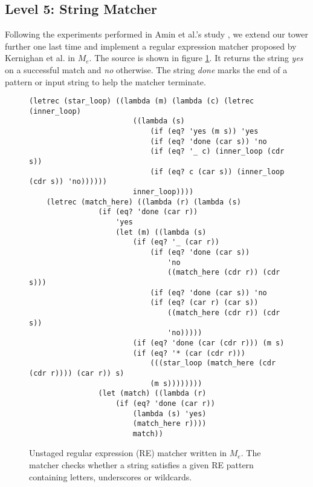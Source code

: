 \documentclass[a4paper,12pt,twoside,openright]{report}
\theoremstyle{definition}
\newcommand{\ts}{\textquotesingle}
\newcommand{\mevl}{$M_{e}$}
\begin{document}

\subsection{Level 5: String Matcher}\label{sec:string_matcher}

Following the experiments performed in Amin et al.'s study \cite{amin2017collapsing}, we extend our tower further one last time and implement a regular expression matcher proposed by Kernighan et al. \cite{kernighan2007regular} in \mevl. The source is shown in figure \ref{lst:regexp}. It returns the string \textit{{\ts}yes} on a successful match and \textit{{\ts}no} otherwise. The string \textit{{\ts}done} marks the end of a pattern or input string to help the matcher terminate.

\begin{figure}[htp!]
    \centering
    \begin{verbatim}
(letrec (star_loop) ((lambda (m) (lambda (c) (letrec (inner_loop)
                        ((lambda (s)
                            (if (eq? 'yes (m s)) 'yes
                            (if (eq? 'done (car s)) 'no
                            (if (eq? '_ c) (inner_loop (cdr s))
                            (if (eq? c (car s)) (inner_loop (cdr s)) 'no))))))
                        inner_loop))))
    (letrec (match_here) ((lambda (r) (lambda (s)
                (if (eq? 'done (car r))
                    'yes
                    (let (m) ((lambda (s)
                        (if (eq? '_ (car r))
                            (if (eq? 'done (car s))
                                'no
                                ((match_here (cdr r)) (cdr s)))
                            (if (eq? 'done (car s)) 'no
                            (if (eq? (car r) (car s))
                                ((match_here (cdr r)) (cdr s))
                                'no)))))
                        (if (eq? 'done (car (cdr r))) (m s)
                        (if (eq? '* (car (cdr r)))
                            (((star_loop (match_here (cdr (cdr r)))) (car r)) s)
                            (m s))))))))
                (let (match) ((lambda (r)
                    (if (eq? 'done (car r))
                        (lambda (s) 'yes)
                        (match_here r))))
                        match))
    \end{verbatim}
    \caption{Unstaged regular expression (RE) matcher written in \mevl. The matcher checks whether a string satisfies a given RE pattern containing letters, underscores or wildcards.}
    \label{lst:regexp}
\end{figure}
\end{document}
